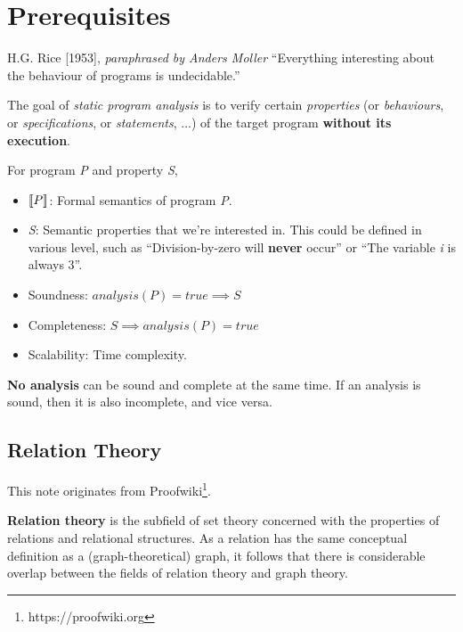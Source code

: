 \chapter{Prerequisites}
\begin{chapquote}{H.G. Rice [1953], \textit{paraphrased by Anders Moller}}
  ``Everything interesting about the behaviour of programs is
  undecidable.''
\end{chapquote}

The goal of \textit{static program analysis} is to verify certain
\textsl{properties} (or \textsl{behaviours}, or
\textsl{specifications}, or \textsl{statements}, ...) of the target
program \textbf{without its execution}.

For program \textsl{P} and property \textsl{S},

\begin{itemize}
\item $ \llbracket P \rrbracket $: Formal semantics of program \textsl{P}.

\item \textsl{S}: Semantic properties that we're interested in. This
  could be defined in various level, such as ``Division-by-zero will
  \textbf{never} occur'' or ``The variable \textit{i} is always 3''.

\item Soundness: $ analysis(P) = true \implies S $

\item Completeness: $ S \implies analysis(P) = true $

\item Scalability: Time complexity.
\end{itemize}


\textbf{No analysis} can be sound and complete at the same time. If an
analysis is sound, then it is also incomplete, and vice versa.

\section{Relation Theory}
This note originates from
Proofwiki\footnote{https://proofwiki.org}.


\textbf{Relation theory} is the subfield of set theory concerned with
the properties of relations and relational structures. As a relation
has the same conceptual definition as a (graph-theoretical) graph, it
follows that there is considerable overlap between the fields of
relation theory and graph theory.

